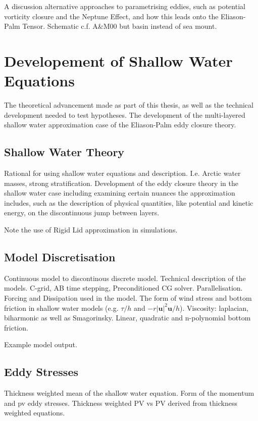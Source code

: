 \documentclass[10pt,a4paper]{article}
\begin{document}
A discussion alternative approaches to parametrising eddies,
such as potential vorticity closure  and 
the Neptune Effect, and how this
leads onto the Eliason-Palm Tensor.
Schematic c.f. A\&M00 but basin instead of sea mount.

\section{Developement of Shallow Water Equations}

The theoretical advancement made as part of this thesis, as well as the technical development 
needed to test hypotheses. The development of the 
multi-layered  shallow water approximation case of the 
Eliason-Palm eddy closure theory.

\subsection{Shallow Water Theory}

Rational for using shallow water equations and
description. I.e. Arctic water masses, 
strong stratification. Development of the eddy closure theory in the shallow water case
including examining certain nuances the approximation includes, such
as the description of physical quantities, like
potential and kinetic energy, on the discontinuous 
jump between layers.

Note the use of Rigid Lid approximation in
simulations.

\subsection{Model Discretisation}

Continuous model to discontinous discrete model.
Technical description of the models. 
C-grid, AB time stepping, Preconditioned CG solver. 
Parallelisation.
Forcing and Dissipation used in the model.
The form of wind stress and bottom friction in
shallow water models (e.g. $\tau/h$ and 
$-r\left|\boldsymbol{u}\right|^{2}\boldsymbol{u}/h$). Viscosity:
laplacian, biharmonic as well as Smagorinsky.
Linear, quadratic and n-polynomial bottom friction.

Example model output.

\subsection{Eddy Stresses}

Thickness weighted mean of the shallow water
equation. Form of the momentum and pv eddy stresses.
Thickness weighted PV vs PV derived from thickness 
weighted equations.
\end{document}
